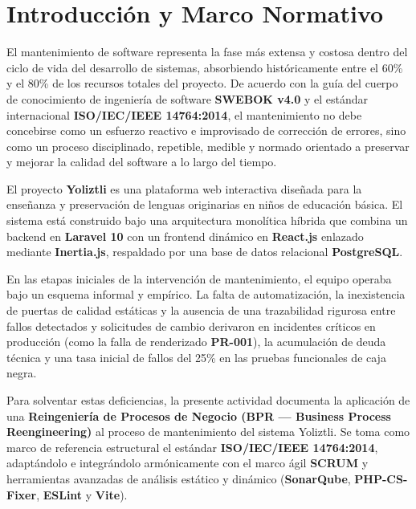 \documentclass[12pt]{article}
\begin{document}


\newpage
{
\hypersetup{linkcolor=black}
\tableofcontents
}
\newpage

\section{Introducción y Marco Normativo}

El mantenimiento de software representa la fase más extensa y costosa dentro del ciclo de vida del desarrollo de sistemas, absorbiendo históricamente entre el 60\% y el 80\% de los recursos totales del proyecto. De acuerdo con la guía del cuerpo de conocimiento de ingeniería de software \textbf{SWEBOK v4.0} y el estándar internacional \textbf{ISO/IEC/IEEE 14764:2014}, el mantenimiento no debe concebirse como un esfuerzo reactivo e improvisado de corrección de errores, sino como un proceso disciplinado, repetible, medible y normado orientado a preservar y mejorar la calidad del software a lo largo del tiempo.

El proyecto \textbf{Yoliztli} es una plataforma web interactiva diseñada para la enseñanza y preservación de lenguas originarias en niños de educación básica. El sistema está construido bajo una arquitectura monolítica híbrida que combina un backend en \textbf{Laravel 10} con un frontend dinámico en \textbf{React.js} enlazado mediante \textbf{Inertia.js}, respaldado por una base de datos relacional \textbf{PostgreSQL}. 

En las etapas iniciales de la intervención de mantenimiento, el equipo operaba bajo un esquema informal y empírico. La falta de automatización, la inexistencia de puertas de calidad estáticas y la ausencia de una trazabilidad rigurosa entre fallos detectados y solicitudes de cambio derivaron en incidentes críticos en producción (como la falla de renderizado \textbf{PR-001}), la acumulación de deuda técnica y una tasa inicial de fallos del 25\% en las pruebas funcionales de caja negra.

Para solventar estas deficiencias, la presente actividad documenta la aplicación de una \textbf{Reingeniería de Procesos de Negocio (BPR --- Business Process Reengineering)} al proceso de mantenimiento del sistema Yoliztli. Se toma como marco de referencia estructural el estándar \textbf{ISO/IEC/IEEE 14764:2014}, adaptándolo e integrándolo armónicamente con el marco ágil \textbf{SCRUM} y herramientas avanzadas de análisis estático y dinámico (\textbf{SonarQube}, \textbf{PHP-CS-Fixer}, \textbf{ESLint} y \textbf{Vite}).
\end{document}
